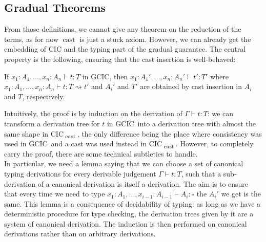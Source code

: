 \documentclass{kaobook}
\renewcommand{\mathtt}{\mathrm}
\newcommand{\uni}[1][]{\square_{#1}}
\newcommand{\comp}{\rightsquigarrow}
\DeclareMathOperator{\?}{?}
\newcommand{\cas}{\operatorname{\mathtt{cast}}}
\newcommand{\gcic}{GCIC}
\newcommand{\cacic}{CIC\textsubscript{$\cas$}}
\begin{document}
{\subsection{Gradual Theorems}


From those definitions, we cannot give any theorem on the reduction of the terms, as for now $\cas$ is just a stuck axiom. However, we can already get the embedding of CIC and the typing part of the gradual guarantee. The central property is the following, ensuring that the cast insertion is well-behaved:
\begin{prop}
If $x_1 : A_1, \dots, x_n : A_n \vdash t : T$ in \gcic, then $x_1 : A_1', \dots, x_n : A_n' \vdash t' : T'$ where $x_1 : A_1, \dots, x_n : A_n \vdash t : T \comp t'$ and $A_i'$ and $T'$ are obtained by cast insertion in $A_i$ and $T$, respectively.
\end{prop}

\begin{dem}[Sketch]
	Intuitively, the proof is by induction on the derivation of $\Gamma \vdash t : T$: we can transform a derivation tree for $t$ in \gcic\ into a derivation tree with almost the same shape in \cacic, the only difference being the place where consistency was used in \gcic\ and a cast was used instead in \cacic. However, to completely carry the proof, there are some technical subtleties to handle.\\
	In particular, we need a lemma saying that we can choose a set of canonical typing derivations for every derivable judgement $\Gamma \vdash t : T$, such that a sub-derivation of a canonical derivation is itself a derivation. The aim is to ensure that every time we need to type $x_1 : A_1, \dots, x_{i-1} : A_{i-1} \vdash A_i : \uni$ the $A_i'$ we get is the same. This lemma is a consequence of decidability of typing: as long as we have a deterministic procedure for type checking, the derivation trees given by it are a system of canonical derivation. The induction is then performed on canonical derivations rather than on arbitrary derivations.
\end{dem}

}
\end{document}
